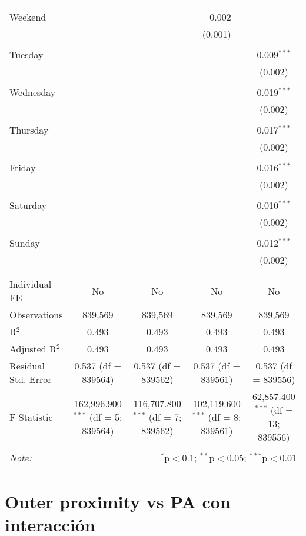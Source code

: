 \documentclass[
]{article}
\begin{document}
\begin{table}[!htbp]
{\begin{tabular}{@{\extracolsep{5pt}}lcccc}
  & & & & \\ 
 Weekend &  &  & $-$0.002 &  \\ 
  &  &  & (0.001) &  \\ 
  & & & & \\ 
 Tuesday &  &  &  & 0.009$^{***}$ \\ 
  &  &  &  & (0.002) \\ 
  & & & & \\ 
 Wednesday &  &  &  & 0.019$^{***}$ \\ 
  &  &  &  & (0.002) \\ 
  & & & & \\ 
 Thursday &  &  &  & 0.017$^{***}$ \\ 
  &  &  &  & (0.002) \\ 
  & & & & \\ 
 Friday &  &  &  & 0.016$^{***}$ \\ 
  &  &  &  & (0.002) \\ 
  & & & & \\ 
 Saturday &  &  &  & 0.010$^{***}$ \\ 
  &  &  &  & (0.002) \\ 
  & & & & \\ 
 Sunday &  &  &  & 0.012$^{***}$ \\ 
  &  &  &  & (0.002) \\ 
  & & & & \\ 
\hline \\[-1.8ex] 
Individual FE & No & No & No & No \\ 
Observations & 839,569 & 839,569 & 839,569 & 839,569 \\ 
R$^{2}$ & 0.493 & 0.493 & 0.493 & 0.493 \\ 
Adjusted R$^{2}$ & 0.493 & 0.493 & 0.493 & 0.493 \\ 
Residual Std. Error & 0.537 (df = 839564) & 0.537 (df = 839562) & 0.537 (df = 839561) & 0.537 (df = 839556) \\ 
F Statistic & 162,996.900$^{***}$ (df = 5; 839564) & 116,707.800$^{***}$ (df = 7; 839562) & 102,119.600$^{***}$ (df = 8; 839561) & 62,857.400$^{***}$ (df = 13; 839556) \\ 
\hline 
\hline \\[-1.8ex] 
\textit{Note:}  & \multicolumn{4}{r}{$^{*}$p$<$0.1; $^{**}$p$<$0.05; $^{***}$p$<$0.01} \\ 
\end{tabular}
} 
\end{table} 
\newpage
\section{Outer proximity vs PA con interacción}
\end{document}
